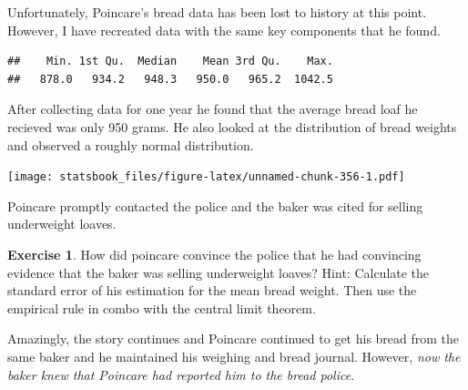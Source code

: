 \documentclass[
]{book}
\newenvironment{Shaded}{\begin{snugshade}}{\end{snugshade}}
\newcommand{\AttributeTok}[1]{\textcolor[rgb]{0.77,0.63,0.00}{#1}}
\newcommand{\FunctionTok}[1]{\textcolor[rgb]{0.00,0.00,0.00}{#1}}
\newcommand{\NormalTok}[1]{#1}
\newcommand{\SpecialCharTok}[1]{\textcolor[rgb]{0.00,0.00,0.00}{#1}}
\newcommand{\StringTok}[1]{\textcolor[rgb]{0.31,0.60,0.02}{#1}}
\theoremstyle{definition}
\theoremstyle{definition}
\theoremstyle{definition}
\newtheorem{exercise}{Exercise}[chapter]
\theoremstyle{definition}
\theoremstyle{remark}
\begin{document}
Unfortunately, Poincare's bread data has been lost to history at this point. However, I have recreated data with the same key components that he found.

\begin{Shaded}
\end{Shaded}

\begin{verbatim}
##    Min. 1st Qu.  Median    Mean 3rd Qu.    Max. 
##   878.0   934.2   948.3   950.0   965.2  1042.5
\end{verbatim}

After collecting data for one year he found that the average bread loaf he recieved was only 950 grams. He also looked at the distribution of bread weights and observed a roughly normal distribution.

\begin{Shaded}
\end{Shaded}

\texttt{[image: statsbook\_files/figure-latex/unnamed-chunk-356-1.pdf]}

Poincare promptly contacted the police and the baker was cited for selling underweight loaves.

\begin{exercise}
\protect\hypertarget{exr:unnamed-chunk-357}{}\label{exr:unnamed-chunk-357}How did poincare convince the police that he had convincing evidence that the baker was selling underweight loaves? Hint: Calculate the standard error of his estimation for the mean bread weight. Then use the empirical rule in combo with the central limit theorem.
\end{exercise}

Amazingly, the story continues and Poincare continued to get his bread from the same baker and he maintained his weighing and bread journal. However, \emph{now the baker knew that Poincare had reported him to the bread police}.
\end{document}
